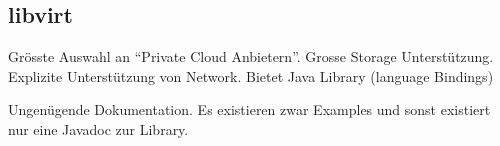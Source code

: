 \subsection{libvirt}
\begin{Argumentation}
\pro Grösste Auswahl an ``Private Cloud Anbietern''.
\pro Grosse Storage Unterstützung.
\pro Explizite Unterstützung von Network.
\pro Bietet Java Library (language Bindings)

\contra Ungenügende Dokumentation. Es existieren zwar Examples und 
sonst existiert nur eine Javadoc zur Library.
\end{Argumentation}









